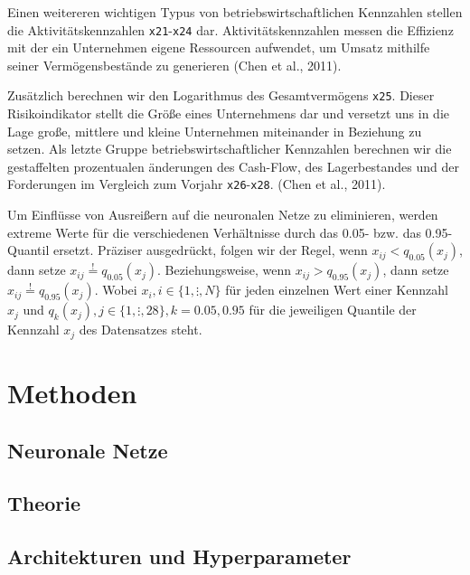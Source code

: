 \documentclass{article}
\begin{document}
Einen weitereren wichtigen Typus von betriebswirtschaftlichen Kennzahlen stellen die Aktivit{\"a}tskennzahlen \texttt{x21}-\texttt{x24} dar. Aktivit{\"a}tskennzahlen messen die Effizienz mit der ein Unternehmen eigene Ressourcen aufwendet, um Umsatz mithilfe seiner Verm{\"o}gensbest{\"a}nde zu generieren (Chen et al., 2011).

Zus{\"a}tzlich berechnen wir den Logarithmus des Gesamtverm{\"o}gens \texttt{x25}. Dieser Risikoindikator stellt die Gr{\"o}{\ss}e eines Unternehmens dar und versetzt uns in die Lage gro{\ss}e, mittlere und kleine Unternehmen miteinander in Beziehung zu setzen. Als letzte Gruppe betriebswirtschaftlicher Kennzahlen berechnen wir die gestaffelten prozentualen {\"a}nderungen des Cash-Flow, des Lagerbestandes und der Forderungen im Vergleich zum Vorjahr \texttt{x26}-\texttt{x28}. (Chen et al., 2011).

Um Einfl{\"u}sse von Ausrei{\ss}ern auf die neuronalen Netze zu eliminieren, werden extreme Werte f{\"u}r die verschiedenen Verh{\"a}ltnisse durch das 0.05- bzw. das 0.95-Quantil ersetzt. Pr{\"a}ziser ausgedr{\"u}ckt, folgen wir der Regel, wenn $x_{ij} < q_{0.05}(x_j)$, dann setze $x_{ij} \stackrel{!}{=} q_{0.05}(x_j)$. Beziehungsweise, wenn $x_{ij} > q_{0.95}(x_j)$, dann setze $x_{ij} \stackrel{!}{=} q_{0.95}(x_j)$. Wobei $x_i, i \in \{1, \vdots, N\}$ f{\"u}r jeden einzelnen Wert einer Kennzahl $x_j$ und $q_k(x_j), j \in \{1, \vdots, 28\}, k=0.05, 0.95$ f{\"u}r die jeweiligen Quantile der Kennzahl $x_j$ des Datensatzes steht.

\section{Methoden}
\subsection{Neuronale Netze}
\subsection{Theorie}
\subsection{Architekturen und Hyperparameter}

\end{document}
